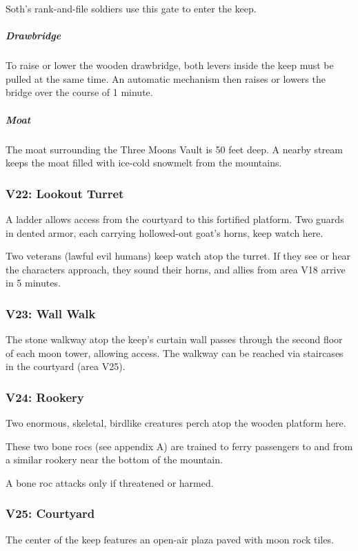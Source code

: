 \documentclass[10pt,a4paper,twoside,bg=print,twocolumn,openany,nodeprecatedcode]{dndbook}
\begin{document}
Soth's rank-and-file soldiers use this gate to enter the keep.

\subparagraph{Drawbridge}
To raise or lower the wooden drawbridge, both levers inside the keep must be pulled at the same time. An automatic mechanism then raises or lowers the bridge over the course of 1 minute.

\subparagraph{Moat}
The moat surrounding the Three Moons Vault is 50 feet deep. A nearby stream keeps the moat filled with ice-cold snowmelt from the mountains.

\subsubsection{V22: Lookout Turret}
\begin{DndReadAloud}{}
A ladder allows access from the courtyard to this fortified platform. Two guards in dented armor, each carrying hollowed-out goat's horns, keep watch here.

\end{DndReadAloud}

Two veterans (lawful evil humans) keep watch atop the turret. If they see or hear the characters approach, they sound their horns, and allies from area V18 arrive in 5 minutes.

\subsubsection{V23: Wall Walk}
The stone walkway atop the keep's curtain wall passes through the second floor of each moon tower, allowing access. The walkway can be reached via staircases in the courtyard (area V25).

\subsubsection{V24: Rookery}
\begin{DndReadAloud}{}
Two enormous, skeletal, birdlike creatures perch atop the wooden platform here.

\end{DndReadAloud}

These two bone rocs (see appendix A) are trained to ferry passengers to and from a similar rookery near the bottom of the mountain.

A bone roc attacks only if threatened or harmed.

\subsubsection{V25: Courtyard}
\begin{DndReadAloud}{}
The center of the keep features an open-air plaza paved with moon rock tiles.

\end{DndReadAloud}
\end{document}
